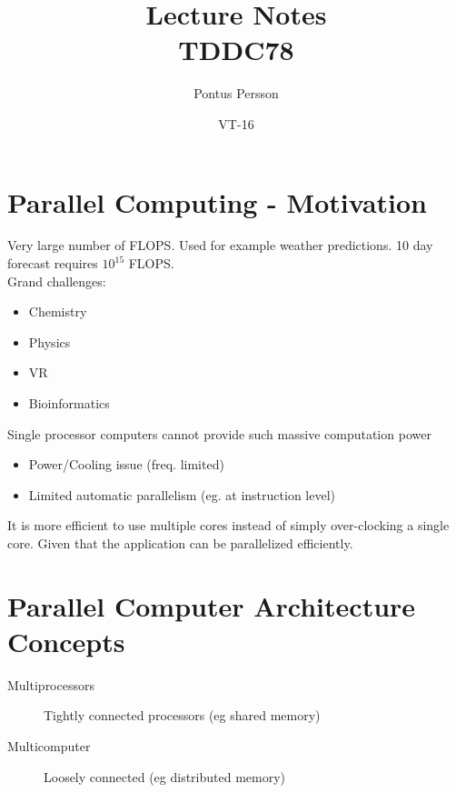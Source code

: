 \documentclass[a4paper]{article}
\author{Pontus Persson}
\title{Lecture Notes\\TDDC78}
\date{VT-16}
\begin{document}
\maketitle
\tableofcontents

\section{Parallel Computing - Motivation}
Very large number of FLOPS. Used for example weather predictions. 10 day forecast
requires $10^{15}$ FLOPS.
\\Grand challenges:
\begin{itemize}
    \item Chemistry
    \item Physics
    \item VR
    \item Bioinformatics
\end{itemize}
Single processor computers cannot provide such massive computation power
\begin{itemize}
    \item Power/Cooling issue (freq. limited)
    \item Limited automatic parallelism (eg. at instruction level)
\end{itemize}
It is more efficient to use multiple cores instead of simply over-clocking a single core.
Given that the application can be parallelized efficiently.

\section{Parallel Computer Architecture Concepts}
\begin{description}
    \item[Multiprocessors] Tightly connected processors (eg shared memory)
    \item[Multicomputer] Loosely connected (eg distributed memory)
\end{description}
\end{document}
